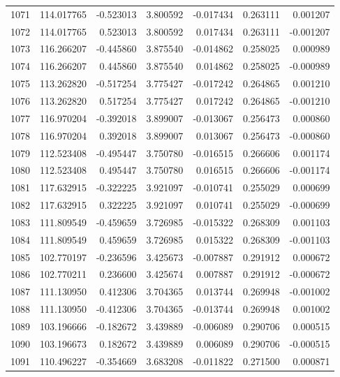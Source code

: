 \begin{tabular}{rrrrrrr}
1071 & 114.017765 &   -0.523013 &  3.800592 &  -0.017434 &   0.263111 &  0.001207 \\
1072 & 114.017765 &    0.523013 &  3.800592 &   0.017434 &   0.263111 & -0.001207 \\
1073 & 116.266207 &   -0.445860 &  3.875540 &  -0.014862 &   0.258025 &  0.000989 \\
1074 & 116.266207 &    0.445860 &  3.875540 &   0.014862 &   0.258025 & -0.000989 \\
1075 & 113.262820 &   -0.517254 &  3.775427 &  -0.017242 &   0.264865 &  0.001210 \\
1076 & 113.262820 &    0.517254 &  3.775427 &   0.017242 &   0.264865 & -0.001210 \\
1077 & 116.970204 &   -0.392018 &  3.899007 &  -0.013067 &   0.256473 &  0.000860 \\
1078 & 116.970204 &    0.392018 &  3.899007 &   0.013067 &   0.256473 & -0.000860 \\
1079 & 112.523408 &   -0.495447 &  3.750780 &  -0.016515 &   0.266606 &  0.001174 \\
1080 & 112.523408 &    0.495447 &  3.750780 &   0.016515 &   0.266606 & -0.001174 \\
1081 & 117.632915 &   -0.322225 &  3.921097 &  -0.010741 &   0.255029 &  0.000699 \\
1082 & 117.632915 &    0.322225 &  3.921097 &   0.010741 &   0.255029 & -0.000699 \\
1083 & 111.809549 &   -0.459659 &  3.726985 &  -0.015322 &   0.268309 &  0.001103 \\
1084 & 111.809549 &    0.459659 &  3.726985 &   0.015322 &   0.268309 & -0.001103 \\
1085 & 102.770197 &   -0.236596 &  3.425673 &  -0.007887 &   0.291912 &  0.000672 \\
1086 & 102.770211 &    0.236600 &  3.425674 &   0.007887 &   0.291912 & -0.000672 \\
1087 & 111.130950 &    0.412306 &  3.704365 &   0.013744 &   0.269948 & -0.001002 \\
1088 & 111.130950 &   -0.412306 &  3.704365 &  -0.013744 &   0.269948 &  0.001002 \\
1089 & 103.196666 &   -0.182672 &  3.439889 &  -0.006089 &   0.290706 &  0.000515 \\
1090 & 103.196673 &    0.182672 &  3.439889 &   0.006089 &   0.290706 & -0.000515 \\
1091 & 110.496227 &   -0.354669 &  3.683208 &  -0.011822 &   0.271500 &  0.000871 \\

\end{tabular}
